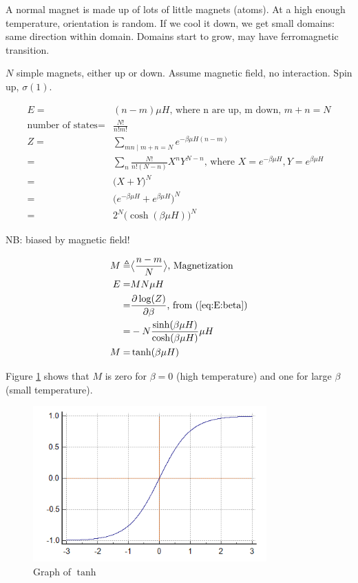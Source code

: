 \documentclass[]{article}
\begin{document}
A normal magnet is made up of lots of little magnets (atoms). At a high enough temperature, orientation is random. If we cool it down, we get small domains: same direction within domain. Domains start to grow, may have ferromagnetic transition.

$N$ simple magnets, either up or down. Assume magnetic field, no interaction. Spin up, $\sigma(1).$

\begin{align*}
E=&(n-m)\mu H\text{, where n are up, m down, $m+n=N$}\\
\text{number of states} =&\frac{N!}{n!m!}\\
Z =&\sum_{mn\mid m+n=N} e^{- \beta \mu H(n-m)}\\
=&\sum_{n}\frac{N!}{n!(N-n)}X^nY^{N-n}\text{, where $X=e^{-\beta\mu H},Y=e^{\beta\mu H}$}\\
=&\big(X+Y\big)^N\tag*{from the Binomial Theorem}\\
=&\big(e^{-\beta\mu H}+e^{\beta\mu H}\big)^N\\
=&2^N \big(\cosh(\beta\mu H)\big)^N\tag*{Definition of cosh}
\end{align*}

NB: biased by magnetic field!

\begin{align*}
	M \triangleq& \big< \frac{n-m}{N}\big>\text{, Magnetization} \\
	E =& M N \mu H\\
	=& \frac{\partial \log(Z)}{\partial \beta} \text{, from (\ref{eq:E:beta})}\\
	=& - N \frac{\sinh(\beta\mu H)}{\cosh(\beta\mu H)} \mu H\\
	M=& \tanh(\beta\mu H)
\end{align*}

Figure \ref{fig:tanh} shows that $M$ is zero for $\beta=0$ (high temperature) and one for large $\beta$ (small temperature).

\begin{figure}[H]
	\caption{Graph of $\tanh$}\label{fig:tanh}
	\includegraphics[width=0.8\textwidth]{tanh}
\end{figure}
\end{document}
